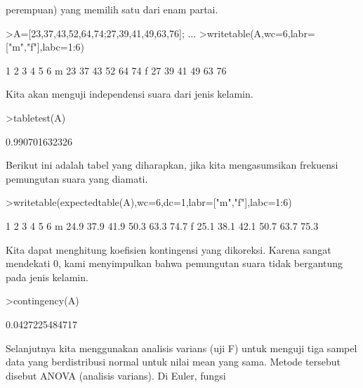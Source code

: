 \documentclass{article}
\begin{document}
\begin{eulernotebook}
\begin{eulercomment}
\begin{eulercomment}
\begin{eulercomment}
perempuan) yang memilih satu dari enam partai.
\end{eulercomment}
\begin{eulerprompt}
>A=[23,37,43,52,64,74;27,39,41,49,63,76];  ...
>writetable(A,wc=6,labr=["m","f"],labc=1:6)
\end{eulerprompt}
\begin{euleroutput}
             1     2     3     4     5     6
       m    23    37    43    52    64    74
       f    27    39    41    49    63    76
\end{euleroutput}
\begin{eulercomment}
Kita akan menguji independensi suara dari jenis kelamin.
\end{eulercomment}
\begin{eulerprompt}
>tabletest(A)
\end{eulerprompt}
\begin{euleroutput}
  0.990701632326
\end{euleroutput}
\begin{eulercomment}
Berikut ini adalah tabel yang diharapkan, jika kita mengasumsikan
frekuensi pemungutan suara yang diamati.
\end{eulercomment}
\begin{eulerprompt}
>writetable(expectedtable(A),wc=6,dc=1,labr=["m","f"],labc=1:6)
\end{eulerprompt}
\begin{euleroutput}
             1     2     3     4     5     6
       m  24.9  37.9  41.9  50.3  63.3  74.7
       f  25.1  38.1  42.1  50.7  63.7  75.3
\end{euleroutput}
\begin{eulercomment}
Kita dapat menghitung koefisien kontingensi yang dikoreksi. Karena
sangat mendekati 0, kami menyimpulkan bahwa pemungutan suara tidak
bergantung pada jenis kelamin.
\end{eulercomment}
\begin{eulerprompt}
>contingency(A)
\end{eulerprompt}
\begin{euleroutput}
  0.0427225484717
\end{euleroutput}
\begin{eulercomment}
\begin{eulercomment}
\begin{eulercomment}
Selanjutnya kita menggunakan analisis varians (uji F) untuk menguji
tiga sampel data yang berdistribusi normal untuk nilai mean yang sama.
Metode tersebut disebut ANOVA (analisis varians). Di Euler, fungsi

\end{eulercomment}
\end{eulercomment}
\end{eulercomment}
\end{eulercomment}
\end{eulercomment}
\end{eulernotebook}
\end{document}
